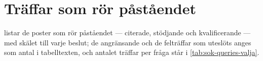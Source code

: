 \section{Träffar som rör påståendet}
\label{sec:vb-traffar}

 listar de poster som rör påståendet ---
citerade, stödjande och kvalificerande --- med skälet till varje
beslut; de angränsande och de felträffar som uteslöts anges som antal i
tabelltexten, och antalet träffar per fråga står i
\cref{tab:sok-queries-valja}.
